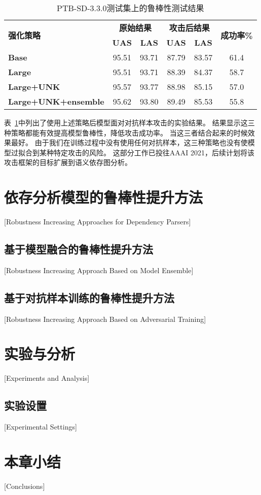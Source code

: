 \begin{table}[h]
	\centering
	\small
	\renewcommand{\arraystretch}{1.2}
	\begin{tabular}{l||cc|cc|c}
		\hline
		\multirow{2}{*}{\bf 强化策略}& \multicolumn{2}{c|}{\bf 原始结果} & \multicolumn{2}{c|}{\bf 攻击后结果} & \multirow{2}{*}{\bf 成功率\%} \\
		\cline{2-5}
		& \bf UAS & \bf LAS & \bf UAS & \bf LAS & \\
		\hline
		\bf Base &95.51 &93.71 &87.79 &83.57 &61.4 \\
		\bf Large &95.51 &93.71 &88.39 &84.37 &58.7 \\
		\bf Large+UNK &95.57 &93.77 &88.98 &85.15 &57.0 \\
		\bf Large+UNK+ensemble &95.62 &93.80 &89.49 &85.53 &55.8 \\
		\hline
	\end{tabular}
	\caption{PTB-SD-3.3.0测试集上的鲁棒性测试结果} 
	\label{tbl:attack-increase}
\end{table}

表~\ref{tbl:attack-increase}中列出了使用上述策略后模型面对对抗样本攻击的实验结果。
结果显示这三种策略都能有效提高模型鲁棒性，降低攻击成功率。
当这三者结合起来的时候效果最好。
由于我们在训练过程中没有使用任何对抗样本，这三种策略也没有使模型过拟合到某种特定攻击的风险。
这部分工作已投往AAAI 2021，后续计划将该攻击框架的目标扩展到语义依存图分析。


\section{依存分析模型的鲁棒性提升方法}[Robustness Increasing Approaches for Dependency Parsers]

\subsection{基于模型融合的鲁棒性提升方法}[Robustness Increasing Approach Based on Model Ensemble]

\subsection{基于对抗样本训练的鲁棒性提升方法}[Robustness Increasing Approach Based on Adversarial Training]


\section{实验与分析}[Experiments and Analysis]

\subsection{实验设置}[Experimental Settings]


\section{本章小结}[Conclusions]



